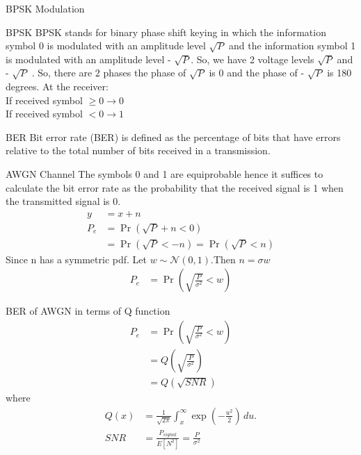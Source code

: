 \documentclass{beamer}
\providecommand{\pr}[1]{\ensuremath{\Pr\left(#1\right)}}
\begin{document}
\begin{frame}{BPSK Modulation }

    \begin{block}{BPSK}
    BPSK stands for binary phase shift keying in which the information symbol 0 is modulated with an amplitude level  $\sqrt{P} $ and the information symbol 1 is modulated with an
amplitude level - $\sqrt{P} $. So, we have 2 voltage levels  $\sqrt{P} $ and -  $\sqrt{P} $ . So, there are 2
phases the phase of  $\sqrt{P} $ is 0 and the phase of -  $\sqrt{P} $ is 180 degrees.
At the receiver:\\
If received symbol $\geq 0 \rightarrow 0$ \\
If received symbol $< 0 \rightarrow 1$
    \end{block}
\end{frame}
\begin{frame}{BER}
Bit error rate (BER) is defined as the percentage of bits that have errors relative to the total number of bits received in a transmission. 
    \begin{block}{AWGN Channel}
    The symbols 0 and 1 are equiprobable hence it suffices to calculate the bit error rate as the probability that the received signal is 1 when the transmitted signal is 0.
    \begin{align}
    y&=x+n\\
        P_e&=\pr{\sqrt{P}+n<0 }\\
        &=\pr{\sqrt{P}<-n }=\pr{\sqrt{P}<n }
    \end{align}
    Since n has a symmetric pdf. Let $w\sim \mathcal{N}(0,1)$.Then $n=\sigma w$
    \begin{align}
     P_e&=\pr{\sqrt{\frac{P}{\sigma^2}}<w }
    \end{align}
    \end{block}
\end{frame}
\begin{frame}{}
\begin{block}{BER of AWGN in terms of Q function}
\begin{align}
     P_e&=\pr{\sqrt{\frac{P}{\sigma^2}}<w }\\
     &=Q\left(\sqrt{\frac{P}{\sigma^2}}\right)\\
     &=Q\left(\sqrt{SNR}\right) \label{6}
    \end{align}
  where \begin{align}
    Q(x)& = \frac{1}{\sqrt{2\pi}} \int_x^\infty \exp\left(-\frac{u^2}{2}\right) \, du.\\
    SNR &=\frac{P_{signal}}{E[N^2]}=\frac{P}{\sigma^2}
  \end{align}
\end{block}
\end{frame}
\end{document}
